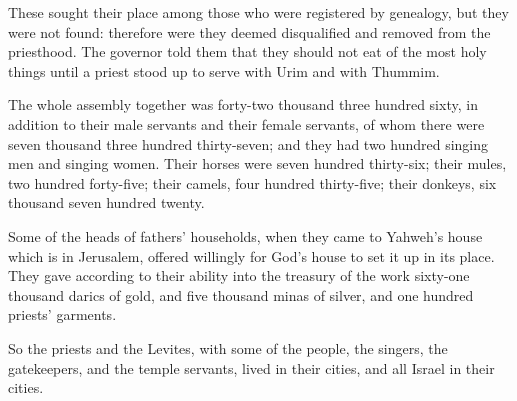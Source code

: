 {These sought their place among those who were registered by genealogy, but they were not found: therefore were they deemed disqualified and removed from the priesthood.
The governor told them that they should not eat of the most holy things until a priest stood up to serve with Urim and with Thummim.
\par }{\PP {}The whole assembly together was forty-two thousand three hundred sixty,
in addition to their male servants and their female servants, of whom there were seven thousand three hundred thirty-seven; and they had two hundred singing men and singing women.
Their horses were seven hundred thirty-six; their mules, two hundred forty-five;
their camels, four hundred thirty-five; their donkeys, six thousand seven hundred twenty.
\par }{\PP {}Some of the heads of fathers’ households, when they came to Yahweh’s house which is in Jerusalem, offered willingly for God’s house to set it up in its place.
They gave according to their ability into the treasury of the work sixty-one thousand darics of gold, and five thousand minas of silver, and one hundred priests’ garments.
\par }{\PP {}So the priests and the Levites, with some of the people, the singers, the gatekeepers, and the temple servants, lived in their cities, and all Israel in their cities.

}
